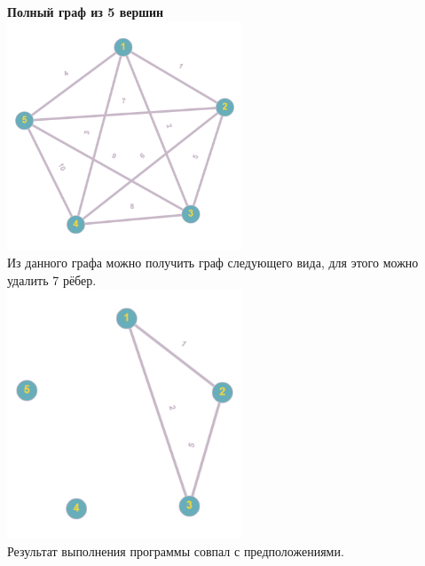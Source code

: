 \documentclass[a4paper,14pt]{extarticle}
\begin{document}
\begin{enumerate}[1.]
        \textbf{Полный граф из 5 вершин}\\
        \includegraphics[width=70mm]{testFull5Before}\\
        Из данного графа можно получить граф следующего вида, для этого можно удалить 7 рёбер.\\
        \includegraphics[width=70mm]{testFull5After}\\
        Результат выполнения программы совпал с предположениями.\\


\end{enumerate}
\end{document}
